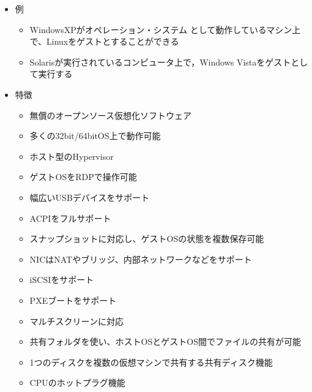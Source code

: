 \begin{itemize}

 \item	例

\begin{itemize}
\setlength{\parskip}{3mm}


 \item	WindowsXPがオペレーション・システム として動作しているマシン上で、Linuxをゲストとすることができる

 \item	Solarisが実行されているコンピュータ上で，Windows Vistaをゲストとして実行する

\end{itemize}


 \item	特徴

\begin{itemize}
\setlength{\parskip}{3mm}

 \item	無償のオープンソース仮想化ソフトウェア

 \item	多くの32bit/64bitOS上で動作可能

 \item	ホスト型のHypervisor

 \item	ゲストOSをRDPで操作可能

 \item	幅広いUSBデバイスをサポート

 \item	ACPIをフルサポート

 \item	スナップショットに対応し、ゲストOSの状態を複数保存可能

 \item	NICはNATやブリッジ、内部ネットワークなどをサポート

 \item	iSCSIをサポート

 \item	PXEブートをサポート

 \item	マルチスクリーンに対応

 \item	共有フォルダを使い、ホストOSとゲストOS間でファイルの共有が可能

 \item	1つのディスクを複数の仮想マシンで共有する共有ディスク機能

 \item	CPUのホットプラグ機能


\end{itemize}
\end{itemize}
